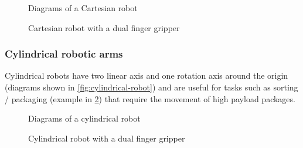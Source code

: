 \begin{figure}[H]
	\begin{floatrow}[2]
		{\caption[Diagrams of a Cartesian robot]{Diagrams of a Cartesian robot\protect\footnotemark}\label{fig:cartesian-robot}}

		{\caption[Cartesian robot with a dual finger gripper]{Cartesian robot with a dual finger gripper\protect\footnotemark}\label{fig:cartesian-robot-festo-3d-gantry}}
	\end{floatrow}
\end{figure}


\subsubsection{Cylindrical robotic arms}

Cylindrical robots have two linear axis and one rotation axis around the origin (diagrams shown in \cref{fig:cylindrical-robot}) and are useful for tasks such as sorting / packaging (example in \cref{fig:cylindrical-robot-plate-crane}) that require the movement of high payload packages.

\begin{figure}[H]
	\begin{floatrow}[2]
		{\caption[Diagrams of a cylindrical robot]{Diagrams of a cylindrical robot\protect\footnotemark}\label{fig:cylindrical-robot}}

		{\caption[Cylindrical robot with a dual finger gripper]{Cylindrical robot with a dual finger gripper\protect\footnotemark}\label{fig:cylindrical-robot-plate-crane}}
	\end{floatrow}
\end{figure}


